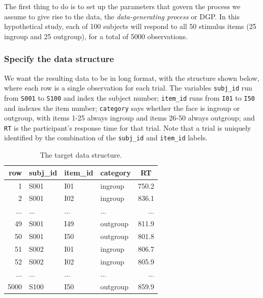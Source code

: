 \documentclass[doc,floatsintext]{apa6}
\begin{document}
The first thing to do is to set up the parameters that govern the process we assume to give rise to the data, the \emph{data-generating process} or DGP. In this hypothetical study, each of 100 subjects will respond to all 50 stimulus items (25 ingroup and 25 outgroup), for a total of 5000 observations.

\hypertarget{specify-the-data-structure}{%
\subsubsection{Specify the data structure}\label{specify-the-data-structure}}

We want the resulting data to be in long format, with the structure shown below, where each row is a single observation for each trial. The variables \texttt{subj\_id} run from \texttt{S001} to \texttt{S100} and index the subject number; \texttt{item\_id} runs from \texttt{I01} to \texttt{I50} and indexes the item number; \texttt{category} says whether the face is ingroup or outgroup, with items 1-25 always ingroup and items 26-50 always outgroup; and \texttt{RT} is the participant's response time for that trial. Note that a trial is uniquely identified by the combination of the \texttt{subj\_id} and \texttt{item\_id} labels.

\begin{table}[H]
\begin{center}
\begin{threeparttable}
\caption{\label{tab:data-example}The target data structure.}
\begin{tabular}{rlllr}
\toprule
row & \multicolumn{1}{c}{subj\_id} & \multicolumn{1}{c}{item\_id} & \multicolumn{1}{c}{category} & \multicolumn{1}{c}{RT}\\
\midrule
1 & S001 & I01 & ingroup & 750.2\\
2 & S001 & I02 & ingroup & 836.1\\
... & ... & ... & ... & ...\\
49 & S001 & I49 & outgroup & 811.9\\
50 & S001 & I50 & outgroup & 801.8\\
51 & S002 & I01 & ingroup & 806.7\\
52 & S002 & I02 & ingroup & 805.9\\
... & ... & ... & ... & ...\\
5000 & S100 & I50 & outgroup & 859.9\\
\bottomrule
\end{tabular}
\end{threeparttable}
\end{center}
\end{table}
\end{document}
